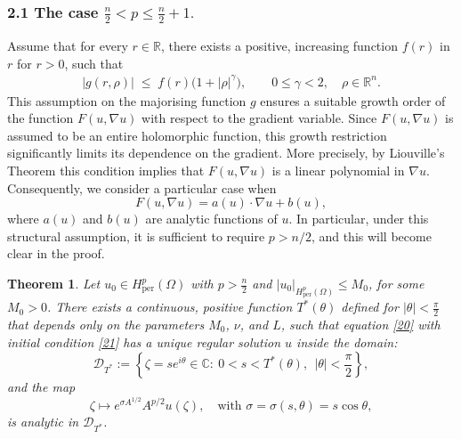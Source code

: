 \documentclass[12pt]{article}
\theoremstyle{plain}
\newtheorem{theorem}{Theorem}
\theoremstyle{remark}
\begin{document}
\subsubsection*{2.1 The case $ \frac{n}{2}< p \leq \frac{n}{2}+1.$}
Assume that for every $r \in \mathbb{R}$, there exists a positive, increasing function $f(r)$ in $r$ for $r>0$, such that
\begin{align}
|g(r,\rho)|\;\le\; f(r)\bigl(1+|\rho|^{\gamma}\bigr),
\qquad 0 \le \gamma < 2, \quad \rho \in \mathbb{R}^n .\label{23}
\end{align}
This assumption on the majorising function $g$ ensures a suitable growth order of the function $F(u,\nabla u)$ with respect to the gradient variable. Since $F(u,\nabla u)$ is assumed to be an entire holomorphic function, this growth restriction significantly limits its dependence on the gradient. More precisely, by Liouville's Theorem this condition implies that $F(u,\nabla u)$ is a  linear polynomial in $\nabla u$. Consequently, we consider a particular case when
\[
F(u,\nabla u) = a(u)\cdot \nabla u + b(u),
\]
where $a(u)$ and $b(u)$ are analytic functions of $u$. In particular, under this structural assumption, it is sufficient to require $p > n/2$, and this will become clear in the proof. 
\begin{theorem}
Let $u_0 \in {H}^p_{\text{per}}(\Omega)$ with $p > \frac{n}{2}$ and $|u_0|_{{H}^p_{\text{per}}(\Omega)} \le M_0$, for some $M_0 > 0$. There exists a continuous, positive function $T^*(\theta)$ defined for $|\theta| < \frac{\pi}{2}$ that depends only on the parameters $M_0$, $\nu$, and $L$, such that equation \eqref{20} with initial condition \eqref{21} has a unique regular solution $u$ inside the domain:
\[
\mathcal{D}_{T^*} := \left\{\zeta = s e^{i\theta} \in \mathbb{C} :\ 0 < s < T^*(\theta), \ \ |\theta| < \frac{\pi}{2}\right\},
\]
and the map
\[
\zeta \longmapsto e^{\sigma A^{1/2}} A^{p/2} u(\zeta), \quad \text{with } \sigma = \sigma(s,\theta) = s\cos\theta,
\]
is analytic in $\mathcal{D}_{T^*}$.
\end{theorem}
\end{document}

